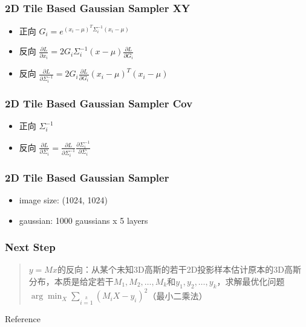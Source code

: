 \documentclass{njupre/njupre}
\begin{document}
\begin{frame}
    \frametitle{2D Tile Based Gaussian Sampler XY}
    
    \begin{itemize}
        \item 正向 $G_i = e^{(x_i-\mu)^T\Sigma_i^{-1}(x_i-\mu)}$
        \item 反向 $\frac{\partial L }{\partial x_i } = 2G_i\Sigma_i^{-1} (x-\mu) \frac{\partial L }{\partial G_i}$
        \item 反向 $\frac{\partial L }{\partial \Sigma_i^{-1}}=2G_i\frac{\partial L }{\partial G_i }(x_i-\mu)^T(x_i-\mu)$
    \end{itemize}
\end{frame}

\begin{frame}
    \frametitle{2D Tile Based Gaussian Sampler Cov}
    
    \begin{itemize}
        \item 正向 $\Sigma_i^{-1}$
        \item 反向 $\frac{\partial L }{\partial \Sigma_i}=\frac{\partial L }{\partial \Sigma_i^{-1}}\frac{\partial \Sigma_i^{-1}}{\partial \Sigma_i}$
    \end{itemize}
\end{frame}

\begin{frame}
    \frametitle{2D Tile Based Gaussian Sampler}
    
    \begin{itemize}
        \item image size: (1024, 1024)
        \item gaussian: 1000 gaussians x 5 layers
    \end{itemize}
\end{frame}

\begin{frame}
    \frametitle{Next Step}
    \begin{quote}
        $y=Mx$的反向：从某个未知3D高斯的若干2D投影样本估计原本的3D高斯分布，本质是给定若干$M_1,M_2,\dots,M_k$和$y_1,y_2,\dots,y_k$，求解最优化问题$\arg\min_X \sum\limits_{i=1}\limits^{k} (M_iX-y_i)^2$（最小二乘法）
    \end{quote}
\end{frame}

\begin{frame}[allowframebreaks]{Reference}
    
    
\end{frame}
\end{document}
